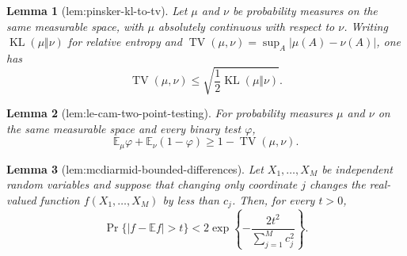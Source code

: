 \documentclass{article}
\newtheorem{lemma}{Lemma}
\begin{document}
\begin{lemma}[lem:pinsker-kl-to-tv]\label{lem:pinsker-kl-to-tv}
Let \(\mu\) and \(\nu\) be probability measures on the same measurable
space, with \(\mu\) absolutely continuous with respect to \(\nu\).  Writing
\(\operatorname{KL}(\mu\Vert\nu)\) for relative entropy and
\(\operatorname{TV}(\mu,\nu)=\sup_A|\mu(A)-\nu(A)|\), one has
\[
 \operatorname{TV}(\mu,\nu)
 \le \sqrt{\frac12\operatorname{KL}(\mu\Vert\nu)}.
\]
\end{lemma}

\begin{lemma}[lem:le-cam-two-point-testing]\label{lem:le-cam-two-point-testing}
For probability measures \(\mu\) and \(\nu\) on the same measurable space
and every binary test \(\varphi\),
\[
 \mathbb E_\mu\varphi+\mathbb E_\nu(1-\varphi)
 \ge 1-\operatorname{TV}(\mu,\nu).
\]
\end{lemma}

\begin{lemma}[lem:mcdiarmid-bounded-differences]\label{lem:mcdiarmid-bounded-differences}
Let \(X_1,\ldots,X_M\) be independent random variables and suppose that
changing only coordinate \(j\) changes the real-valued function
\(f(X_1,\ldots,X_M)\) by less than \(c_j\).  Then, for every \(t>0\),
\[
 \Pr\{|f-\mathbb Ef|>t\}
 < 2\exp\left\{-\frac{2t^2}{\sum_{j=1}^M c_j^2}\right\}.
\]
\end{lemma}
\end{document}

